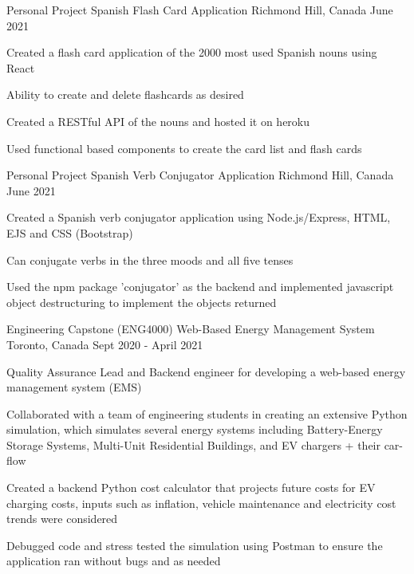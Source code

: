 


\begin{cventries}

\cventry
{Personal Project}
{Spanish Flash Card Application}
{Richmond Hill, Canada}
{June 2021}
{ %
\begin{cvitems}
\item {Created a flash card application of the 2000 most used Spanish nouns using React}
\item {Ability to create and delete flashcards as desired}
\item {Created a RESTful API of the nouns and hosted it on heroku}
\item {Used functional based components to create the card list and flash cards}
\end{cvitems}
}

\cventry
{Personal Project}
{Spanish Verb Conjugator Application}
{Richmond Hill, Canada}
{June 2021}
{ %
\begin{cvitems}
\item {Created a Spanish verb conjugator application using Node.js/Express, HTML, EJS and CSS (Bootstrap)}
\item {Can conjugate verbs in the three moods and all five tenses}
\item {Used the npm package 'conjugator' as the backend and implemented javascript object destructuring to implement the objects returned}
\end{cvitems}
}


\cventry
{Engineering Capstone (ENG4000)} %
{Web-Based Energy Management System} %
{Toronto, Canada} %
{Sept 2020 - April 2021} %
{ %
\begin{cvitems}
\item {Quality Assurance Lead and Backend engineer for developing a web-based energy management system (EMS)}
\item {Collaborated with a team of engineering students in creating an extensive Python simulation, which simulates several energy systems including Battery-Energy Storage Systems, Multi-Unit Residential Buildings, and EV chargers + their car-flow}
\item {Created a backend Python cost calculator that projects future costs for EV charging costs, inputs such as inflation, vehicle maintenance and electricity cost trends were considered}
\item {Debugged code and stress tested the simulation using Postman to ensure the application ran without bugs and as needed}
\end{cvitems}
}


\end{cventries}
